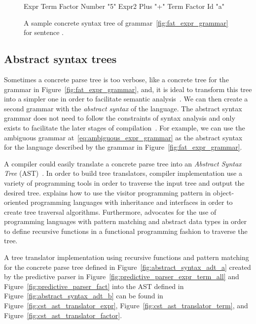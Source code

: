 \documentclass[
  oneside,
  english,
  coorientadorbanca,
  noabntexcite
]{ufsc-thesis-rn46-2019}
\newcommand{\codett}[1]{\text{\scpfamily#1}}
\newcommand{\code}[1]{\text{\scpfamily\setlength\spaceskip{0.35em}#1}}
\begin{document}
\begin{figure}[ht]
  \centering
  \begin{minipage}{0.5\textwidth}
    \begin{rustcode}
Expr
  Term
    Factor
      Number "5"
  Expr2
    Plus "+"
    Term
      Factor
        Id "a"
    \end{rustcode}
  \end{minipage}
  \caption{
    A sample concrete syntax tree of grammar~\ref{fig:fat_expr_grammar} for sentence \codett{5 + a}.
  }\label{fig:concrete_syntax_tree}
\end{figure}

\subsection{Abstract syntax trees}\label{sec:syntax:subsec:abstrac_syntax_trees}

Sometimes a concrete parse tree is too verbose, like a concrete tree for the grammar in Figure~\ref{fig:fat_expr_grammar}, and, it is ideal to transform this tree into a simpler one in order to facilitate semantic analysis~\cite{appel2003modern}.
We can then create a second grammar with the \textit{abstract syntax} of the language.
The abstract syntax grammar does not need to follow the constraints of syntax analysis and only exists to facilitate the later stages of compilation~\cite{appel2003modern}.
For example, we can use the ambiguous grammar at~\eqref{eq:ambiguous_expr_grammar} as the abstract syntax for the language described by the grammar in Figure~\ref{fig:fat_expr_grammar}.

A compiler could easily translate a concrete parse tree into an \textit{Abstract Syntax Tree} (AST)~\cite{appel2003modern}.
In order to build tree translators, compiler implementation use a variety of programming tools in order to traverse the input tree and output the desired tree.
\textcite{appel2003modern} explains how to use the visitor programming pattern in object-oriented programming languages with inheritance and interfaces in order to create tree traversal algorithms.
Furthermore, \textcite{pierce2002types} advocates for the use of programming languages with pattern matching and abstract data types in order to define recursive functions in a functional programming fashion to traverse the tree.

A tree translator implementation using recursive functions and pattern matching for the concrete parse tree \code{Parse} defined in Figure~\ref{fig:abstract_syntax_adt_a} created by the predictive parser in Figure~\ref{fig:predictive_parser_expr_term_all} and Figure~\ref{fig:predictive_parser_fact} into the AST defined in Figure~\ref{fig:abstract_syntax_adt_b} can be found in Figure~\ref{fig:cst_ast_translator_expr}, Figure~\ref{fig:cst_ast_translator_term}, and Figure~\ref{fig:cst_ast_translator_factor}.
\end{document}
